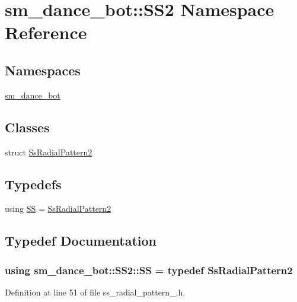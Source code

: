 \hypertarget{namespacesm__dance__bot_1_1SS2}{}\section{sm\+\_\+dance\+\_\+bot\+:\+:S\+S2 Namespace Reference}
\label{namespacesm__dance__bot_1_1SS2}
\subsection*{Namespaces}
\begin{DoxyCompactItemize}
\item 
 \hyperlink{namespacesm__dance__bot_1_1SS2_1_1sm__dance__bot}{sm\+\_\+dance\+\_\+bot}
\end{DoxyCompactItemize}
\subsection*{Classes}
\begin{DoxyCompactItemize}
\item 
struct \hyperlink{structsm__dance__bot_1_1SS2_1_1SsRadialPattern2}{Ss\+Radial\+Pattern2}
\end{DoxyCompactItemize}
\subsection*{Typedefs}
\begin{DoxyCompactItemize}
\item 
using \hyperlink{namespacesm__dance__bot_1_1SS2_a3af437d3b5fb32a00b12e171154d9165}{SS} = \hyperlink{structsm__dance__bot_1_1SS2_1_1SsRadialPattern2}{Ss\+Radial\+Pattern2}
\end{DoxyCompactItemize}


\subsection{Typedef Documentation}
\subsubsection[{\texorpdfstring{SS}{SS}}]{\setlength{\rightskip}{0pt plus 5cm}using {\bf sm\+\_\+dance\+\_\+bot\+::\+S\+S2\+::\+SS} = typedef {\bf Ss\+Radial\+Pattern2}}\hypertarget{namespacesm__dance__bot_1_1SS2_a3af437d3b5fb32a00b12e171154d9165}{}\label{namespacesm__dance__bot_1_1SS2_a3af437d3b5fb32a00b12e171154d9165}


Definition at line 51 of file ss\+\_\+radial\+\_\+pattern\+\_.\+h.

